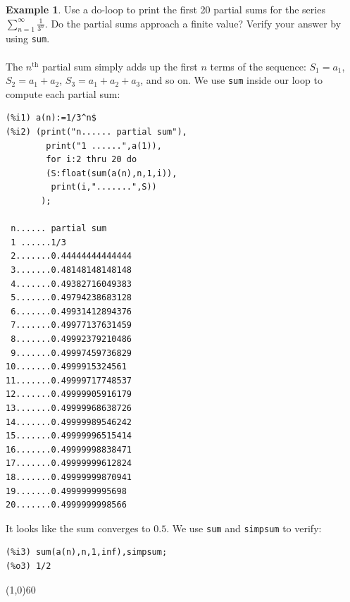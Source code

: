 \documentclass[10.5pt,twoside]{report}
\theoremstyle{definition}
\newtheorem{exmp}{Example}[section]
\begin{document}
\begin{exmp} Use a do-loop to print the first 20 partial sums for the series $\sum_{n=1}^{\infty} \frac{1}{3^n}$.  Do the partial sums approach a finite value?  Verify your answer by using \verb|sum|.\\

${}$\\

The $n^{\mathrm{th}}$ partial sum simply adds up the first $n$ terms of the sequence:  $S_1=a_1$, $S_2=a_1+a_2$, $S_3=a_1+a_2+a_3$, and so on.   We use \verb|sum| inside our loop to compute each partial sum: 

\begin{verbatim}
(%i1) a(n):=1/3^n$
(%i2) (print("n...... partial sum"),
        print("1 ......",a(1)),
        for i:2 thru 20 do
        (S:float(sum(a(n),n,1,i)),
         print(i,".......",S))
       );
       
 n...... partial sum
 1 ......1/3
 2.......0.44444444444444
 3.......0.48148148148148
 4.......0.49382716049383
 5.......0.49794238683128
 6.......0.49931412894376
 7.......0.49977137631459
 8.......0.49992379210486
 9.......0.49997459736829
10.......0.4999915324561
11.......0.49999717748537
12.......0.49999905916179
13.......0.49999968638726
14.......0.49999989546242
15.......0.49999996515414
16.......0.49999998838471
17.......0.49999999612824
18.......0.49999999870941
19.......0.4999999995698
20.......0.4999999998566
\end{verbatim}

It looks like the sum converges to $0.5$.  We use \verb|sum| and \verb|simpsum| to verify:

\begin{verbatim}
(%i3) sum(a(n),n,1,inf),simpsum;
(%o3) 1/2
\end{verbatim}

\end{exmp}

\line(1,0){60}
\linethickness{0.5mm}
${}$\\
\end{document}
